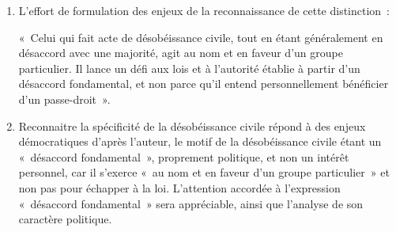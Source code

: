 {\begin{enumerate}
Chercher à identifier concrètement les présupposés et conséquences de ce «
préjugé~» et de «~cette mauvaise volonté~» participera du travail d'interprétation. Qui
pourrait avoir intérêt à nier la distinction entre «~le criminel~» et «~celui qui fait acte de
désobéissance civile~»~? Lancer «~un défi aux lois et à l'autorité établie~» expose à
des sanctions, tant que la loi est toujours en vigueur. Cependant, traiter celui qui fait
acte de désobéissance civile sans faire de distinction avec un criminel pourrait
relever d'une croyance aveugle au bien-fondé et à l'infaillibilité de l'autorité ou de la
loi établie, ou d'une «~mauvaise volonté~» de l'autorité qui chercherait à empêcher
une mise en question publique.

\item L'effort de formulation des enjeux de la reconnaissance de cette distinction~:

«~Celui qui fait acte de désobéissance civile, tout en étant généralement en
désaccord avec une majorité, agit au nom et en faveur d'un groupe particulier. Il
lance un défi aux lois et à l'autorité établie à partir d'un désaccord fondamental, et
non parce qu'il entend personnellement bénéficier d'un passe-droit~».

\item Reconnaitre la spécificité de la désobéissance civile répond à des enjeux
démocratiques d'après l'auteur, le motif de la désobéissance civile étant un
«~désaccord fondamental~», proprement politique, et non un intérêt personnel, car il
s'exerce «~au nom et en faveur d'un groupe particulier~» et non pas pour échapper à la loi. L'attention accordée à l'expression «~désaccord fondamental~» sera
appréciable, ainsi que l'analyse de son caractère politique.
\end{enumerate}}%
